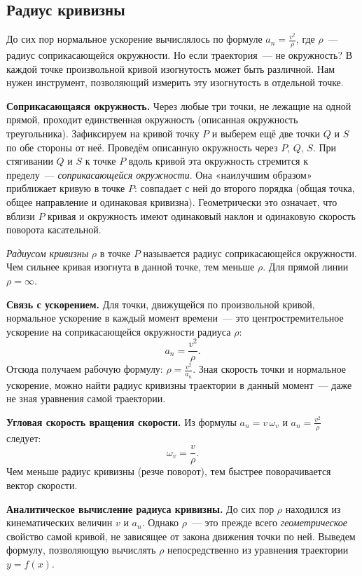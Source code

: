\documentclass[../main.tex]{subfiles}
\begin{document}
\subsection{Радиус кривизны}

До сих пор нормальное ускорение вычислялось по формуле $a_n = \frac{v^2}{\rho}$,
где $\rho$~--- радиус соприкасающейся окружности. Но если траектория~--- не окружность?
В каждой точке произвольной кривой изогнутость может быть различной.
Нам нужен инструмент, позволяющий измерить эту изогнутость в отдельной точке.

\noindent\textbf{Соприкасающаяся окружность.}
Через любые три точки, не лежащие на одной прямой, проходит
единственная окружность (описанная окружность треугольника).
Зафиксируем на кривой точку $P$ и выберем ещё две точки $Q$ и $S$
по обе стороны от неё. Проведём описанную окружность через $P$, $Q$, $S$.
При стягивании $Q$ и $S$ к точке $P$ вдоль кривой эта окружность
стремится к пределу~--- \textit{соприкасающейся окружности}.
Она «наилучшим образом» приближает кривую в точке $P$:
совпадает с ней до второго порядка (общая точка, общее направление
и одинаковая кривизна). Геометрически это означает, что вблизи $P$
кривая и окружность имеют одинаковый наклон и одинаковую скорость
поворота касательной.

\begin{definition}
\textit{Радиусом кривизны} $\rho$ в точке $P$ называется радиус
соприкасающейся окружности. Чем сильнее кривая изогнута в данной точке,
тем меньше $\rho$. Для прямой линии $\rho = \infty$.
\end{definition}

\noindent\textbf{Связь с ускорением.}
Для точки, движущейся по произвольной кривой, нормальное ускорение
в каждый момент времени~--- это центростремительное ускорение на
соприкасающейся окружности радиуса $\rho$:
\[
a_n = \frac{v^2}{\rho}.
\]
Отсюда получаем рабочую формулу: $\rho = \frac{v^2}{a_n}$.
Зная скорость точки и нормальное ускорение, можно найти радиус кривизны
траектории в данный момент~--- даже не зная уравнения самой траектории.

\noindent\textbf{Угловая скорость вращения скорости.}
Из формулы $a_n = v\,\omega_v$ и $a_n = \frac{v^2}{\rho}$ следует:
\[
\omega_v = \frac{v}{\rho}.
\]
Чем меньше радиус кривизны (резче поворот), тем быстрее поворачивается
вектор скорости.

\noindent\textbf{Аналитическое вычисление радиуса кривизны.}
До сих пор $\rho$ находился из кинематических величин $v$ и $a_n$.
Однако $\rho$~--- это прежде всего \textit{геометрическое} свойство самой кривой,
не зависящее от закона движения точки по ней. Выведем формулу,
позволяющую вычислять $\rho$ непосредственно из уравнения траектории $y = f(x)$.
\end{document}
